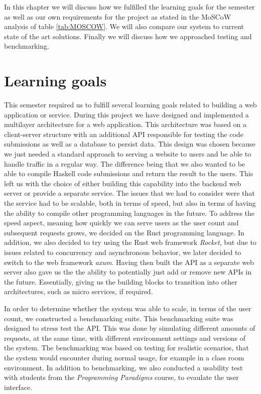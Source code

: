 In this chapter we will discuss how we fulfilled the learning goals for the semester as well as our own requirements for the project as stated in the MoSCoW analysis of table \ref{tab:MOSCOW}. We will also compare our system to current state of the art solutions. Finally we will discuss how we approached testing and benchmarking.

\section{Learning goals}
This semester required us to fulfill several learning goals related to building a web application or service. During this project we have designed and implemented a multilayer architecture for a web application. This architecture was based on a client-server structure with an additional API responsible for testing the code submissions as well as a database to persist data. This design was chosen because we just needed a standard approach to serving a website to users and be able to handle traffic in a regular way. The difference being that we also wanted to be able to compile Haskell code submissions and return the result to the users. This left us with the choice of either building this capability into the backend web server or provide a separate service. The issues that we had to consider were that the service had to be scalable, both in terms of speed, but also in terms of having the ability to compile other programming languages in the future. 
To address the speed aspect, meaning how quickly we can serve users as the user count and subsequent requests grows, we decided on the Rust programming language. In addition, we also decided to try using the Rust web framework \textit{Rocket}, but due to issues related to concurrency and asynchronous behavior, we later decided to switch to the web framework \textit{axum}. Having then built the API as a separate web server also gave us the the ability to potentially just add or remove new APIs in the future. Essentially, giving us the building blocks to transition into other architectures, such as micro services, if required.

In order to determine whether the system was able to scale, in terms of the user count, we constructed a benchmarking suite. This benchmarking suite was designed to stress test the API. This was done by simulating different amounts of requests, at the same time, with different environment settings and versions of the system. The benchmarking was based on testing for realistic scenarios, that the system would encounter during normal usage, for example in a class room environment. 
In addition to benchmarking, we also conducted a usability test with students from the \textit{Programming Paradigms} course, to evaulate the user interface. 



